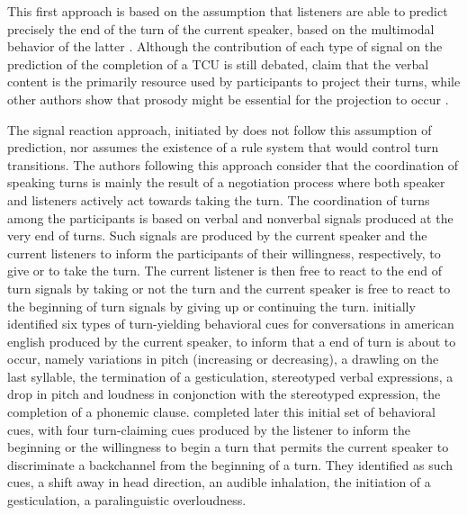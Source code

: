 This first approach is based on the assumption that listeners are able to predict precisely the end of the turn of the current speaker, based on the multimodal behavior of the latter \citep{french_turn-competitive_1983,ford_interactional_1996,mondada_multimodal_2007}.
Although the contribution of each type of signal on the prediction of the completion of a TCU is still debated, \citep{de_ruiter_projecting_2006} claim that the verbal content is the primarily resource used by participants to project their turns, while other authors show that prosody might be essential for the projection to occur \citep{bogels_listeners_2015}.

The signal reaction approach, initiated by \citep{duncan_signals_1972} does not follow this assumption of prediction, nor assumes the existence of a rule system that would control turn transitions. The authors following this approach consider that the coordination of speaking turns is mainly the result of a negotiation process where both speaker and listeners actively act towards taking the turn. 
The coordination of turns among the participants is based on verbal and nonverbal signals produced at the very end of turns. Such signals are produced by the current speaker and the current listeners to inform the participants of their willingness, respectively, to give or to take the turn. 
The current listener is then free to react to the end of turn signals by taking or not the turn and the current speaker is free to react to the beginning of turn signals by giving up or continuing the turn. \citep{duncan_signals_1972} initially identified six types of turn-yielding behavioral cues for conversations in american english produced by the current speaker, to inform that a end of turn is about to occur, namely variations in pitch (increasing or decreasing), a drawling on the last syllable, the termination of a gesticulation, stereotyped verbal expressions, a drop in pitch and loudness in conjonction with the stereotyped expression, the completion of a phonemic clause. \citep{duncan_signalling_1974} completed later this initial set of behavioral cues, with four turn-claiming cues produced by the listener to inform the beginning or the willingness to begin a turn that permits the current speaker to discriminate a backchannel from the beginning of a turn. They identified as such cues, a shift away in head direction, an audible inhalation, the initiation of a gesticulation, a paralinguistic overloudness. 

